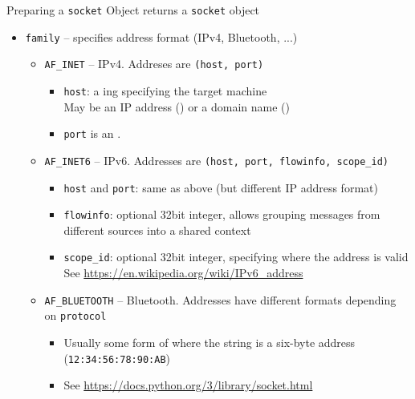 \begin{frame}{Preparing a \texttt{socket} Object}
%
 returns a \texttt{socket} object
\begin{itemize}
\item \texttt{family} -- specifies address format (\zB IPv4, Bluetooth, ...)
	\begin{itemize}
	\item \texttt{AF\_INET} -- IPv4. Addreses are \texttt{(host, port)}
		\begin{itemize}
		\item \texttt{host}: a ing specifying the target machine \\
			May be an IP address (\zB {}) or a domain name (\zB {})
		\item \texttt{port} is an .
		\end{itemize}
	\item \texttt{AF\_INET6} -- IPv6. Addresses are \texttt{(host, port, flowinfo, scope\_id)}
		\begin{itemize}
		\item \texttt{host} and \texttt{port}: same as above (but different IP address format)
		\item \texttt{flowinfo}: optional 32bit integer, allows grouping messages from different sources into a shared context
		\item \texttt{scope\_id}: optional 32bit integer, specifying where the address is valid \\
			See \url{https://en.wikipedia.org/wiki/IPv6_address}
		\end{itemize}
	\item \texttt{AF\_BLUETOOTH} -- Bluetooth. Addresses have different formats depending on \texttt{protocol}
		\begin{itemize}
		\item Usually some form of  where the string is a six-byte address (\texttt{12:34:56:78:90:AB})
		\item See \url{https://docs.python.org/3/library/socket.html}
		\end{itemize}
	\end{itemize}
\end{itemize}
%
\end{frame}


